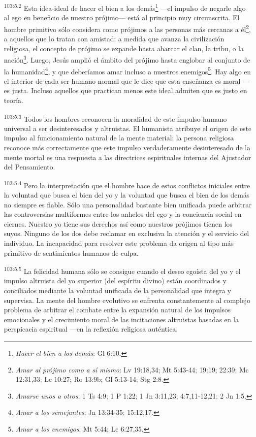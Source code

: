 \documentclass[twoside, 11pt]{book}
\begin{document}
\par
\textsuperscript{103:5.2} Esta idea-ideal de hacer el bien a los demás\footnote{\textit{Hacer el bien a los demás}: Gl 6:10.} ---el impulso de negarle algo al ego en beneficio de nuestro prójimo--- está al principio muy circunscrita. El hombre primitivo sólo considera como prójimos a las personas más cercanas a él\footnote{\textit{Amar al prójimo como a sí mismo}: Lv 19:18,34; Mt 5:43-44; 19:19; 22:39; Mc 12:31,33; Lc 10:27; Ro 13:9b; Gl 5:13-14; Stg 2:8.}, a aquellos que lo tratan con amistad; a medida que avanza la civilización religiosa, el concepto de prójimo se expande hasta abarcar el clan, la tribu, o la nación\footnote{\textit{Amarse unos a otros}: 1 Ts 4:9; 1 P 1:22; 1 Jn 3:11,23; 4:7,11-12,21; 2 Jn 1:5.}. Luego, Jesús amplió el ámbito del prójimo hasta englobar al conjunto de la humanidad\footnote{\textit{Amar a los semejantes}: Jn 13:34-35; 15:12,17.}, y que deberíamos amar incluso a nuestros enemigos\footnote{\textit{Amar a los enemigos}: Mt 5:44; Lc 6:27,35.}. Hay algo en el interior de cada ser humano normal que le dice que esta enseñanza es moral ---es justa. Incluso aquellos que practican menos este ideal admiten que es justo en teoría.

\par
\textsuperscript{103:5.3} Todos los hombres reconocen la moralidad de este impulso humano universal a ser desinteresados y altruistas. El humanista atribuye el origen de este impulso al funcionamiento natural de la mente material; la persona religiosa reconoce más correctamente que este impulso verdaderamente desinteresado de la mente mortal es una respuesta a las directrices espirituales internas del Ajustador del Pensamiento.

\par
\textsuperscript{103:5.4} Pero la interpretación que el hombre hace de estos conflictos iniciales entre la voluntad que busca el bien del yo y la voluntad que busca el bien de los demás no siempre es fiable. Sólo una personalidad bastante bien unificada puede arbitrar las controversias multiformes entre los anhelos del ego y la conciencia social en ciernes. Nuestro yo tiene sus derechos así como nuestros prójimos tienen los suyos. Ninguno de los dos debe reclamar en exclusiva la atención y el servicio del individuo. La incapacidad para resolver este problema da origen al tipo más primitivo de sentimientos humanos de culpa.

\par
\textsuperscript{103:5.5} La felicidad humana sólo se consigue cuando el deseo egoísta del yo y el impulso altruista del yo superior (del espíritu divino) están coordinados y conciliados mediante la voluntad unificada de la personalidad que integra y supervisa. La mente del hombre evolutivo se enfrenta constantemente al complejo problema de arbitrar el combate entre la expansión natural de los impulsos emocionales y el crecimiento moral de las incitaciones altruistas basadas en la perspicacia espiritual ---en la reflexión religiosa auténtica.
\end{document}
